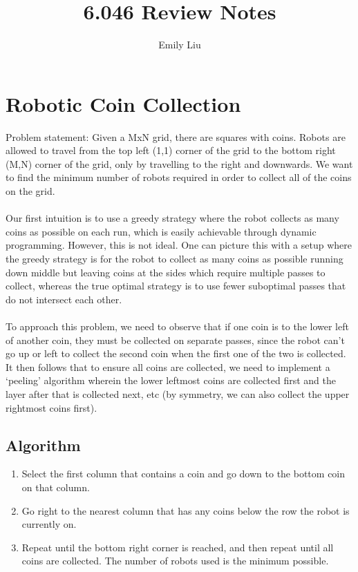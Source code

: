 \documentclass{article}
\title{6.046 Review Notes}
\author{Emily Liu}
\begin{document}
\maketitle

\section{Robotic Coin Collection}
Problem statement: Given a MxN grid, there are squares with coins. Robots are allowed to travel from the top left (1,1) corner of the grid to the bottom right (M,N) corner of the grid, only by travelling to the right and downwards. We want to find the minimum number of robots required in order to collect all of the coins on the grid.
\\
\\
Our first intuition is to use a greedy strategy where the robot collects as many coins as possible on each run, which is easily achievable through dynamic programming. However, this is not ideal. One can picture this with a setup where the greedy strategy is for the robot to collect as many coins as possible running down middle but leaving coins at the sides which require multiple passes to collect, whereas the true optimal strategy is to use fewer suboptimal passes that do not intersect each other.
\\
\\
To approach this problem, we need to observe that if one coin is to the lower left of another coin, they must be collected on separate passes, since the robot can't go up or left to collect the second coin when the first one of the two is collected. It then follows that to ensure all coins are collected, we need to implement a `peeling' algorithm wherein the lower leftmost coins are collected first and the layer after that is collected next, etc (by symmetry, we can also collect the upper rightmost coins first).

\subsection*{Algorithm}
\begin{enumerate}
    \item Select the first column that contains a coin and go down to the bottom coin on that column.
    \item Go right to the nearest column that has any coins below the row the robot is currently on.
    \item Repeat until the bottom right corner is reached, and then repeat until all coins are collected. The number of robots used is the minimum possible.
\end{enumerate}
\end{document}

